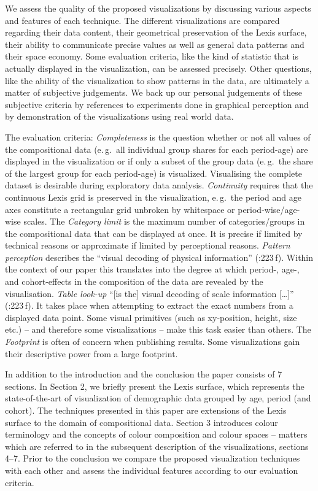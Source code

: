 \documentclass[a4paper]{scrartcl}
\begin{document}
We assess the quality of the proposed visualizations by discussing various aspects and features of each technique. The different visualizations are compared regarding their data content, their geometrical preservation of the Lexis surface, their ability to communicate precise values as well as general data patterns and their space economy. Some evaluation criteria, like the kind of statistic that is actually displayed in the visualization, can be assessed precisely. Other questions, like the ability of the visualization to show patterns in the data, are ultimately a matter of subjective judgements. We back up our personal judgements of these subjective criteria by references to experiments done in graphical perception and by demonstration of the visualizations using real world data.

The evaluation criteria:
\emph{Completeness} is the question whether or not all values of the compositional data (e.\,g.~all individual group shares for each period-age) are displayed in the visualization or if only a subset of the group data (e.\,g.~the share of the largest group for each period-age) is visualized. Visualising the complete dataset is desirable during exploratory data analysis.
\emph{Continuity} requires that the continuous Lexis grid is preserved in the visualization, e.\,g.~the period and age axes constitute a rectangular grid unbroken by whitespace or period-wise/age-wise scales.
The \emph{Category limit} is the maximum number of categories/groups in the compositional data that can be displayed at once. It is precise if limited by technical reasons or approximate if limited by perceptional reasons.
\emph{Pattern perception} describes the \enquote{visual decoding of physical information} (\cite{Cleveland1994}:223\,f). Within the context of our paper this translates into the degree at which  period-, age-, and cohort-effects in the composition of the data are revealed by the visualisation.
\emph{Table look-up} \enquote{[is the] visual decoding of scale information [\ldots]} (\cite{Cleveland1994}:223\,f). It takes place when attempting to extract the exact numbers from a displayed data point. Some visual primitives (such as xy-position, height, size etc.) -- and therefore some visualizations -- make this task easier than others.
The \emph{Footprint} is often of concern when publishing results. Some visualizations gain their descriptive power from a large footprint.

In addition to the introduction and the conclusion the paper consists of 7 sections. In Section 2, we briefly present the Lexis surface, which represents the state-of-the-art of visualization of demographic data grouped by age, period (and cohort). The techniques presented in this paper are extensions of the Lexis surface to the domain of compositional data. Section 3 introduces colour terminology and the concepts of colour composition and colour spaces -- matters which are referred to in the subsequent description of the visualizations, sections 4--7. Prior to the conclusion we compare the proposed visualization techniques with each other and assess the individual features according to our evaluation criteria.
\end{document}
